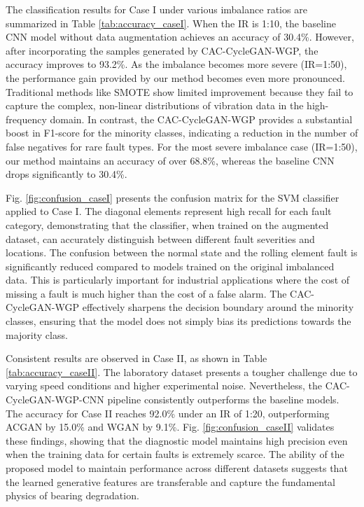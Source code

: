 The classification results for Case I under various imbalance ratios are summarized in Table \ref{tab:accuracy_caseI}. When the IR is 1:10, the baseline CNN model without data augmentation achieves an accuracy of 30.4\%. However, after incorporating the samples generated by CAC-CycleGAN-WGP, the accuracy improves to 93.2\%. As the imbalance becomes more severe (IR=1:50), the performance gain provided by our method becomes even more pronounced. Traditional methods like SMOTE \cite{6} show limited improvement because they fail to capture the complex, non-linear distributions of vibration data in the high-frequency domain. In contrast, the CAC-CycleGAN-WGP provides a substantial boost in F1-score for the minority classes, indicating a reduction in the number of false negatives for rare fault types. For the most severe imbalance case (IR=1:50), our method maintains an accuracy of over 68.8\%, whereas the baseline CNN drops significantly to 30.4\%.

Fig. \ref{fig:confusion_caseI} presents the confusion matrix for the SVM classifier applied to Case I. The diagonal elements represent high recall for each fault category, demonstrating that the classifier, when trained on the augmented dataset, can accurately distinguish between different fault severities and locations. The confusion between the normal state and the rolling element fault is significantly reduced compared to models trained on the original imbalanced data. This is particularly important for industrial applications where the cost of missing a fault is much higher than the cost of a false alarm. The CAC-CycleGAN-WGP effectively sharpens the decision boundary around the minority classes, ensuring that the model does not simply bias its predictions towards the majority class.

Consistent results are observed in Case II, as shown in Table \ref{tab:accuracy_caseII}. The laboratory dataset presents a tougher challenge due to varying speed conditions and higher experimental noise. Nevertheless, the CAC-CycleGAN-WGP-CNN pipeline consistently outperforms the baseline models. The accuracy for Case II reaches 92.0\% under an IR of 1:20, outperforming ACGAN by 15.0\% and WGAN by 9.1\%. Fig. \ref{fig:confusion_caseII} validates these findings, showing that the diagnostic model maintains high precision even when the training data for certain faults is extremely scarce. The ability of the proposed model to maintain performance across different datasets suggests that the learned generative features are transferable and capture the fundamental physics of bearing degradation.

